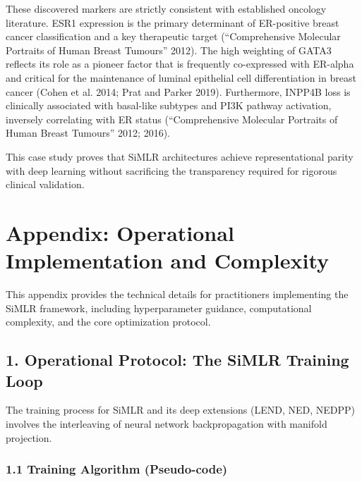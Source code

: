 \documentclass[
  letterpaper,
]{report}
\begin{document}
These discovered markers are strictly consistent with established
oncology literature. ESR1 expression is the primary determinant of
ER-positive breast cancer classification and a key therapeutic target
({``Comprehensive Molecular Portraits of Human Breast Tumours''} 2012).
The high weighting of GATA3 reflects its role as a pioneer factor that
is frequently co-expressed with ER-alpha and critical for the
maintenance of luminal epithelial cell differentiation in breast cancer
(Cohen et al. 2014; Prat and Parker 2019). Furthermore, INPP4B loss is
clinically associated with basal-like subtypes and PI3K pathway
activation, inversely correlating with ER status ({``Comprehensive
Molecular Portraits of Human Breast Tumours''} 2012; 2016).

This case study proves that SiMLR architectures achieve representational
parity with deep learning without sacrificing the transparency required
for rigorous clinical validation.

\chapter{Appendix: Operational Implementation and
Complexity}\label{appendix-operational-implementation-and-complexity}

This appendix provides the technical details for practitioners
implementing the SiMLR framework, including hyperparameter guidance,
computational complexity, and the core optimization protocol.

\section{1. Operational Protocol: The SiMLR Training
Loop}\label{operational-protocol-the-simlr-training-loop}

The training process for SiMLR and its deep extensions (LEND, NED,
NEDPP) involves the interleaving of neural network backpropagation with
manifold projection.

\subsection{1.1 Training Algorithm
(Pseudo-code)}\label{training-algorithm-pseudo-code}
\end{document}
